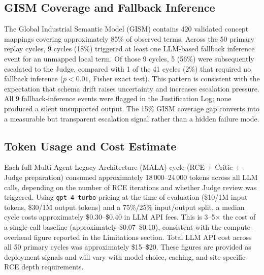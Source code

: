 \documentclass[conference]{IEEEtran}
\newcommand{\MALA}{Multi Agent Legacy Architecture (MALA)}
\begin{document}
\begin{table}[!t]
\sffamily
\caption{Per-Source Latency Breakdown for Cycle~17 (14 min total)}\label{tab:source_latency}
\centering
\small
{}
\end{table}


\subsection{GISM Coverage and Fallback Inference}

The Global Industrial Semantic Model (GISM) contains 420 validated concept mappings covering approximately 85\% of observed terms. Across the 50 primary replay cycles, 9 cycles (18\%) triggered at least one LLM-based fallback inference event for an unmapped local term. Of those 9 cycles, 5 (56\%) were subsequently escalated to the Judge, compared with 1 of the 41 cycles (2\%) that required no fallback inference ($p < 0.01$, Fisher exact test). This pattern is consistent with the expectation that schema drift raises uncertainty and increases escalation pressure. All 9 fallback-inference events were flagged in the Justification Log; none produced a silent unsupported output. The 15\% GISM coverage gap converts into a measurable but transparent escalation signal rather than a hidden failure mode.

\subsection{Token Usage and Cost Estimate}

Each full \MALA{} cycle (RCE + Critic + Judge preparation) consumed approximately 18\,000--24\,000 tokens across all LLM calls, depending on the number of RCE iterations and whether Judge review was triggered. Using \texttt{gpt-4-turbo} pricing at the time of evaluation (\$10/1M input tokens, \$30/1M output tokens) and a 75\%/25\% input/output split, a median cycle costs approximately \$0.30--\$0.40 in LLM API fees. This is 3--5$\times$ the cost of a single-call baseline (approximately \$0.07--\$0.10), consistent with the compute-overhead figure reported in the Limitations section. Total LLM API cost across all 50 primary cycles was approximately \$15--\$20. These figures are provided as deployment signals and will vary with model choice, caching, and site-specific RCE depth requirements.
\end{document}
